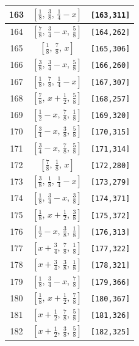 \documentclass[fleqn,8pt]{jsarticle}
\begin{document}
\begin{longtable}{ccc}
163 & $\left[ \frac{1}{8},\, \frac{3}{8},\, \frac{1}{4} - x \right]$ & {\tt [163,311]} \\ \hline
164 & $\left[ \frac{7}{8},\, \frac{3}{4} - x,\, \frac{5}{8} \right]$ & {\tt [164,262]} \\ \hline
165 & $\left[ \frac{1}{8},\, \frac{7}{8},\, x \right]$ & {\tt [165,306]} \\ \hline
166 & $\left[ \frac{3}{8},\, \frac{3}{4} - x,\, \frac{5}{8} \right]$ & {\tt [166,260]} \\ \hline
167 & $\left[ \frac{1}{8},\, \frac{7}{8},\, \frac{1}{4} - x \right]$ & {\tt [167,307]} \\ \hline
168 & $\left[ \frac{7}{8},\, x + \frac{1}{2},\, \frac{5}{8} \right]$ & {\tt [168,257]} \\ \hline
169 & $\left[ \frac{1}{2} - x,\, \frac{7}{8},\, \frac{1}{8} \right]$ & {\tt [169,320]} \\ \hline
170 & $\left[ \frac{3}{4} - x,\, \frac{3}{8},\, \frac{5}{8} \right]$ & {\tt [170,315]} \\ \hline
171 & $\left[ \frac{3}{4} - x,\, \frac{7}{8},\, \frac{5}{8} \right]$ & {\tt [171,314]} \\ \hline
172 & $\left[ \frac{7}{8},\, \frac{1}{8},\, x \right]$ & {\tt [172,280]} \\ \hline
173 & $\left[ \frac{3}{8},\, \frac{1}{8},\, \frac{1}{4} - x \right]$ & {\tt [173,279]} \\ \hline
174 & $\left[ \frac{1}{8},\, \frac{3}{4} - x,\, \frac{3}{8} \right]$ & {\tt [174,371]} \\ \hline
175 & $\left[ \frac{1}{8},\, x + \frac{1}{2},\, \frac{3}{8} \right]$ & {\tt [175,372]} \\ \hline
176 & $\left[ \frac{1}{2} - x,\, \frac{3}{8},\, \frac{1}{8} \right]$ & {\tt [176,313]} \\ \hline
177 & $\left[ x + \frac{3}{4},\, \frac{7}{8},\, \frac{1}{8} \right]$ & {\tt [177,322]} \\ \hline
178 & $\left[ x + \frac{3}{4},\, \frac{3}{8},\, \frac{1}{8} \right]$ & {\tt [178,321]} \\ \hline
179 & $\left[ \frac{1}{8},\, \frac{3}{4} - x,\, \frac{7}{8} \right]$ & {\tt [179,366]} \\ \hline
180 & $\left[ \frac{1}{8},\, x + \frac{1}{2},\, \frac{7}{8} \right]$ & {\tt [180,367]} \\ \hline
181 & $\left[ x + \frac{1}{2},\, \frac{7}{8},\, \frac{5}{8} \right]$ & {\tt [181,326]} \\ \hline
182 & $\left[ x + \frac{1}{2},\, \frac{3}{8},\, \frac{5}{8} \right]$ & {\tt [182,325]} \\ \hline

\end{longtable}
\end{document}
